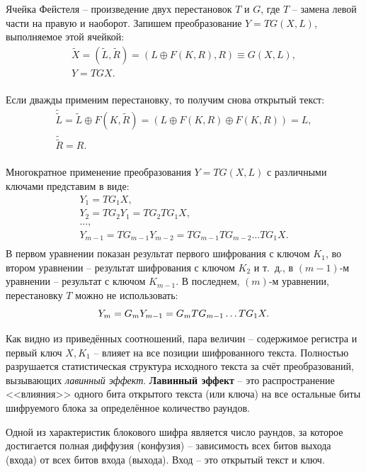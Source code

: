 Ячейка Фейстеля -- произведение двух перестановок $T$ и $G$, где $T$ -- замена левой части на правую и наоборот. Запишем преобразование $Y=TG(X,L)$, выполняемое этой ячейкой:
\[
  \begin{array}{l}
    \tilde{X} = (\tilde{L}, \tilde{R}) = (L \oplus F(K,R), R) \equiv G(X, L), \\
    Y = TGX. \\
  \end{array}
\]

Если дважды применим перестановку, то получим снова открытый текст:
\[
    \begin{array}{l}
        \tilde{\tilde{L}} = \tilde{L} \oplus F(K, \tilde{R}) = (L \oplus F(K,R) \oplus F(K,R)) = L, \\
        \tilde{\tilde{R}} = R.\\
    \end{array}
\]

Многократное применение преобразования $Y=TG(X,L)$ с различными ключами представим в виде:
\[
  \begin{array}{l}
    Y_1 = T G_1 X,\\
    Y_2 = T G_2 Y_1 = T G_2 T G_1 X, \\
    \ldots, \\
    Y_{m-1} = T G_{m-1} Y_{m-2} = T G_{m-1} T G_{m-2} \ldots T G_1 X.\\
  \end{array}
\]
В первом уравнении показан результат первого шифрования с ключом $K_{1}$, во втором уравнении -- результат шифрования с ключом $K_{2}$ и т.~д., в $(m-1)$-м уравнении -- результат с ключом $K_{m-1}$. В последнем, $(m)$-м уравнении, перестановку $T$ можно не использовать:
\[
   Y_{m}= G_{m} Y_{m-1} = G_{m} T G_{m-1} \ldots T G_{1} X.\\
\]

Как видно из приведённых соотношений, пара величин -- содержимое регистра и первый ключ $X, K_{1}$ -- влияет на все позиции шифрованного текста. Полностью разрушается статистическая структура исходного текста за счёт преобразований, вызывающих \emph{лавинный эффект}. \textbf{Лавинный эффект} -- это распространение <<влияния>> одного бита открытого текста (или ключа) на все остальные биты шифруемого блока за определённое количество раундов.

Одной из характеристик блокового шифра является число раундов, за которое достигается полная диффузия (конфузия) -- зависимость всех битов выхода (входа) от всех битов входа (выхода). Вход -- это открытый текст и ключ.

